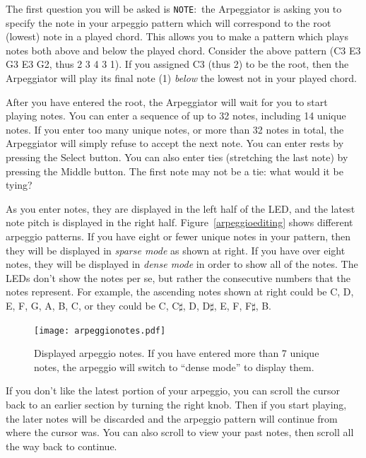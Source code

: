 \documentclass{article}
\begin{document}
The first question you will be asked is \texttt{NOTE}:\ the Arpeggiator is asking you to specify the note in your arpeggio pattern which will correspond to the root (lowest) note in a played chord.  This allows you to make a pattern which plays notes both above and below the played chord.  Consider the above pattern (C3 E3 G3 E3 G2, thus 2 3 4 3 1).  If you assigned C3 (thus 2) to be the root, then the Arpeggiator will play its final note (1) {\it below} the lowest not in your played chord.

After you have entered the root, the Arpeggiator will wait for you to start playing notes.  You can enter a sequence of up to 32 notes, including 14 unique notes.  If you enter too many unique notes, or more than 32 notes in total, the Arpeggiator will simply refuse to accept the next note.  You can enter rests by pressing the Select button.  You can also enter ties (stretching the last note) by pressing the Middle button.  The first note may not be a tie: what would it be tying?

As you enter notes, they are displayed in the left half of the LED, and the latest note pitch is displayed in the right half. Figure~\ref{arpeggioediting} shows different arpeggio patterns.  If you have eight or fewer unique notes in your pattern, then they will be displayed in {\it sparse mode} as shown at right.  If you have over eight notes, they will be displayed in {\it dense mode} in order to show all of the notes.  The LEDs don't show the notes per se, but rather the consecutive numbers that the notes represent.  For example, the ascending notes shown at right could be C, D, E, F, G, A, B, C, or they could be C, C\(\sharp\), D, D\(\sharp\), E, F, F\(\sharp\), B.

\begin{figure}
\begin{center}
\vspace{-2.5em}
\texttt{[image: arpeggionotes.pdf]}\\
\end{center}
\vspace{-1em}\caption{Displayed arpeggio notes.  If you have entered more than 7 unique notes, the arpeggio will switch to ``dense mode'' to display them.}
\vspace{-1em}
\label{arpeggionotes}
\end{figure}

If you don't like the latest portion of your arpeggio, you can scroll the cursor back to an earlier section by turning the right knob.  Then if you start playing, the later notes will be discarded and the arpeggio pattern will continue from where the cursor was.  You can also scroll to view your past notes, then scroll all the way back to continue.
\end{document}
